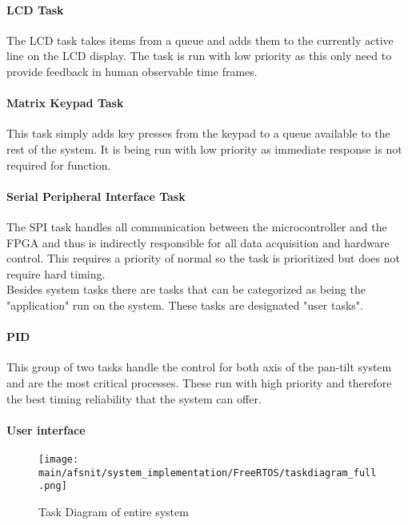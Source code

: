 \documentclass[../../../main]{subfiles}
\begin{document}
\paragraph{LCD Task}

The LCD task takes items from a queue and adds them to the currently active line on the LCD display. The task is run with low  priority as this only need to provide feedback in human observable time frames.

\paragraph{Matrix Keypad Task}

This task simply adds key presses from the keypad to a queue available to the rest of the system. It is being run with low priority as immediate response is not required for function.

\paragraph{Serial Peripheral Interface Task}

The SPI task handles all communication between the microcontroller and the FPGA and thus is indirectly responsible for all data acquisition and hardware control. This requires a priority of normal  so the task is prioritized but does not require hard timing.\\

Besides system tasks there are tasks that can be categorized as being the "application" run on the system. These tasks are designated "user tasks".

\paragraph{PID}

This group of two tasks handle the control for both axis of the pan-tilt system and are the most critical processes. These run with high priority and therefore the best timing reliability that the system can offer.

\paragraph{User interface}


\begin{figure}[H]
\texttt{[image: \\main/afsnit/system\_implementation/FreeRTOS/taskdiagram\_full.png]}
\caption{Task Diagram of entire system}
\label{fig:entire_task_diagram}
\end{figure}
\end{document}
